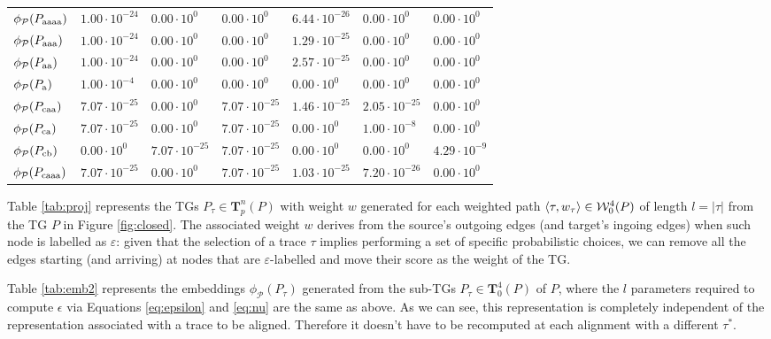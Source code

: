 \begin{table}[!t]
\begin{tabular}{l|l|l|l|l|l|l|}
		
		$\phi_{\mathcal{P}}(P_\textup{aaaa})$ & $1.00\cdot 10^{-24}$ & $0.00\cdot 10^{0}$ & $0.00\cdot 10^{0}$& $6.44\cdot 10^{-26}$& $0.00\cdot 10^{0}$& $0.00\cdot 10^{0}$\\
		$\phi_{\mathcal{P}}(P_\textup{aaa})$ & $1.00\cdot 10^{-24}$ & $0.00\cdot 10^{0}$ & $0.00\cdot 10^{0}$& $1.29\cdot 10^{-25}$& $0.00\cdot 10^{0}$& $0.00\cdot 10^{0}$\\
		$\phi_{\mathcal{P}}(P_\textup{aa})$ & $1.00\cdot 10^{-24}$ & $0.00\cdot 10^{0}$ & $0.00\cdot 10^{0}$& $2.57\cdot 10^{-25}$& $0.00\cdot 10^{0}$& $0.00\cdot 10^{0}$\\
		$\phi_{\mathcal{P}}(P_\textup{a})$ & $1.00\cdot 10^{-4}$ & $0.00\cdot 10^{0}$ & $0.00\cdot 10^{0}$& $0.00\cdot 10^{0}$& $0.00\cdot 10^{0}$& $0.00\cdot 10^{0}$\\
		$\phi_{\mathcal{P}}(P_\textup{caa})$ & $7.07\cdot 10^{-25}$ & $0.00\cdot 10^{0}$ & $7.07\cdot 10^{-25}$& $1.46\cdot 10^{-25}$& $2.05\cdot 10^{-25}$& $0.00\cdot 10^{0}$\\
		$\phi_{\mathcal{P}}(P_\textup{ca})$ & $7.07\cdot 10^{-25}$ & $0.00\cdot 10^{0}$ & $7.07\cdot 10^{-25}$& $0.00\cdot 10^{0}$& $1.00\cdot 10^{-8}$& $0.00\cdot 10^{0}$\\
		$\phi_{\mathcal{P}}(P_\textup{cb})$ &  $0.00\cdot 10^{0}$ & $7.07\cdot 10^{-25}$ & $7.07\cdot 10^{-25}$& $0.00\cdot 10^{0}$&  $0.00\cdot 10^{0}$ & $4.29\cdot 10^{-9}$\\
		$\phi_{\mathcal{P}}(P_\textup{caaa})$  & $7.07\cdot 10^{-25}$ &  $0.00\cdot 10^{0}$ & $7.07\cdot 10^{-25}$& $1.03\cdot 10^{-25}$&  $7.20\cdot 10^{-26}$ & $0.00\cdot 10^{0}$\\
		\bottomrule
	\end{tabular}
\end{table}
\begin{example}\label{ex:explainembed}
	Table \ref{tab:proj} represents the TGs $P_\tau\in\mathbf{T}_p^n(P)$ with weight $w$ generated for each weighted path $\braket{\tau,w_\tau}\in \mathcal{W}_0^4(P)$ of length $l=|\tau|$ from the TG $P$ in Figure \ref{fig:closed}. The associated weight $w$ derives from the source's outgoing edges (and target's ingoing edges) when such node is labelled as $\varepsilon$: given that the selection of a trace $\tau$ implies performing a set of specific probabilistic choices, we can remove all the edges starting (and arriving) at nodes that are $\varepsilon$-labelled and move their score as the weight of the TG. 

Table \ref{tab:emb2} represents the embeddings $\phi_{\mathcal{P}}(P_\tau)$ generated from the sub-TGs $P_\tau\in \mathbf{T}_0^4(P)$ of $P$, where the $l$ parameters required to compute $\epsilon$ via Equations \ref{eq:epsilon} and \ref{eq:nu} are the same as above. As we can see, this representation is completely independent of the representation associated with a trace to be aligned. Therefore it doesn't have to be recomputed at each alignment with a different $\tau^*$.
\end{example}




